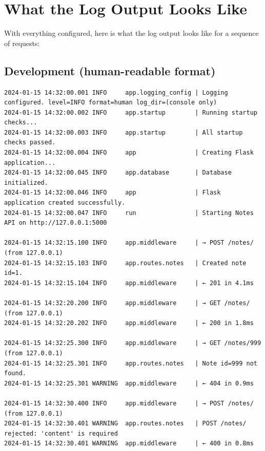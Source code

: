 \setcounter{section}{7}
\section{What the Log Output Looks Like}\label{16-logging-error-handling:168-what-the-log-output-looks-like}

With everything configured, here is what the log output looks like for a sequence of requests:

\subsection*{Development (human-readable format)}\label{16-logging-error-handling:development-human-readable-format}

\begin{outputbox}
\begin{Verbatim}[fontsize=\codesize, breaklines, breakanywhere, breaksymbolleft={\tiny\textcolor{muted}{$\hookrightarrow$}}]
2024-01-15 14:32:00.001 INFO     app.logging_config | Logging configured. level=INFO format=human log_dir=(console only)
2024-01-15 14:32:00.002 INFO     app.startup        | Running startup checks...
2024-01-15 14:32:00.003 INFO     app.startup        | All startup checks passed.
2024-01-15 14:32:00.004 INFO     app                | Creating Flask application...
2024-01-15 14:32:00.045 INFO     app.database       | Database initialized.
2024-01-15 14:32:00.046 INFO     app                | Flask application created successfully.
2024-01-15 14:32:00.047 INFO     run                | Starting Notes API on http://127.0.0.1:5000

2024-01-15 14:32:15.100 INFO     app.middleware     | → POST /notes/ (from 127.0.0.1)
2024-01-15 14:32:15.103 INFO     app.routes.notes   | Created note id=1.
2024-01-15 14:32:15.104 INFO     app.middleware     | ← 201 in 4.1ms

2024-01-15 14:32:20.200 INFO     app.middleware     | → GET /notes/ (from 127.0.0.1)
2024-01-15 14:32:20.202 INFO     app.middleware     | ← 200 in 1.8ms

2024-01-15 14:32:25.300 INFO     app.middleware     | → GET /notes/999 (from 127.0.0.1)
2024-01-15 14:32:25.301 INFO     app.routes.notes   | Note id=999 not found.
2024-01-15 14:32:25.301 WARNING  app.middleware     | ← 404 in 0.9ms

2024-01-15 14:32:30.400 INFO     app.middleware     | → POST /notes/ (from 127.0.0.1)
2024-01-15 14:32:30.401 WARNING  app.routes.notes   | POST /notes/ rejected: 'content' is required
2024-01-15 14:32:30.401 WARNING  app.middleware     | ← 400 in 0.8ms
\end{Verbatim}
\end{outputbox}

